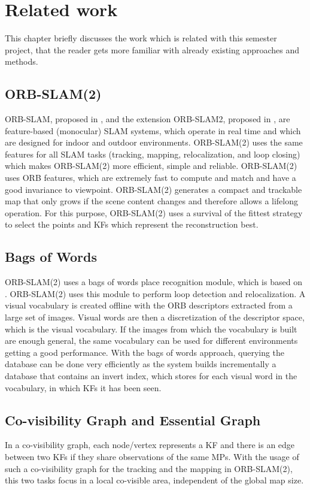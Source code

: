 \chapter{Related work}
\label{sec:related_work}

This chapter briefly discusses the work which is related with this semester project, that the reader gets more familiar with already existing approaches and methods.

\section{ORB-SLAM(2)}
ORB-SLAM, proposed in \cite{Mur-Artal2015}, and the extension ORB-SLAM2, proposed in \cite{Mur-Artal2016}, are feature-based (monocular) \ac{SLAM} systems, which operate in real time and which are designed for indoor and outdoor environments. ORB-SLAM(2) uses the same features for all \ac{SLAM} tasks (tracking, mapping, relocalization, and loop closing) which makes ORB-SLAM(2) more efficient, simple and reliable. ORB-SLAM(2) uses ORB features, which are extremely fast to compute and match and have a good invariance to viewpoint. ORB-SLAM(2) generates a compact and trackable map that only grows if the scene content changes and therefore allows a lifelong operation. For this purpose, ORB-SLAM(2) uses a survival of the fittest strategy to select the points and \acfp{KF} which represent the reconstruction best.

\section{Bags of Words}
ORB-SLAM(2) uses a bags of words place recognition module, which is based on \cite{Galvez-Lopez2012}. ORB-SLAM(2) uses this module to perform loop detection and relocalization. A visual vocabulary is created offline with the ORB descriptors extracted from a large set of images. Visual words are then a discretization of the descriptor space, which is the visual vocabulary. If the images from which the vocabulary is built are enough general, the same vocabulary can be used for different environments getting a good performance. With the bags of words approach, querying the database can be done very efficiently as the system builds incrementally a database that contains an invert index, which stores for each visual word in the vocabulary, in which \acp{KF} it has been seen.

\section{Co-visibility Graph and Essential Graph}
In a co-visibility graph, each node/vertex represents a \ac{KF} and there is an edge between two \acp{KF} if they share observations of the same \acfp{MP}. With the usage of such a co-visibility graph for the tracking and the mapping in ORB-SLAM(2), this two tasks focus in a local co-visible area, independent of the global map size.

